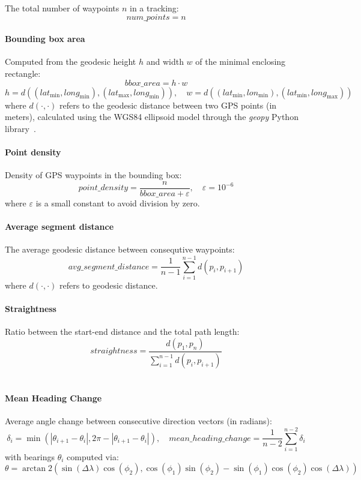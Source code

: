 \documentclass[a4paper,12pt,twoside]{scrreprt}
\begin{document}
The total number of waypoints $n$ in a tracking:
\[
  num\_points = n
\]

\paragraph{Bounding box area}

Computed from the geodesic height $h$ and width $w$ of the minimal enclosing
rectangle:
\[
  bbox\_area = h \cdot w
\]
\[
  h = d((lat_{\min}, long_{\min}), (lat_{\max}, long_{\min})), \quad w =
  d((lat_{\min}, lon_{\min}), (lat_{\min}, long_{\max}))
\]
where $d(\cdot, \cdot)$ refers to the geodesic distance between two GPS points
(in
meters), calculated using the WGS84 ellipsoid model through the \textit{geopy}
Python library~\cite{noauthor_welcome_nodate}.

\paragraph{Point density}

Density of GPS waypoints in the bounding box:
\[
  point\_density = \frac{n}{bbox\_area + \varepsilon}, \quad
  \varepsilon = 10^{-6}
\]
where $\varepsilon$ is a small constant to avoid division by zero.

\paragraph{Average segment distance}

The average geodesic distance between consequtive waypoints:
\[
  avg\_segment\_distance = \frac{1}{n-1} \sum_{i=1}^{n-1} d(p_i, p_{i+1})
\]
where $d(\cdot, \cdot)$ refers to geodesic distance.

\paragraph{Straightness}
Ratio between the start-end distance and the total path length:
\[
  straightness = \frac{d(p_1, p_n)}{\sum_{i=1}^{n-1} d(p_i, p_{i+1})}
\]
~\cite{benhamou_how_2004}

\paragraph{Mean Heading Change}
Average angle change between consecutive direction vectors (in radians):
\[
  \delta_i = \min(|\theta_{i+1} - \theta_i|, 2\pi - |\theta_{i+1} - \theta_i|),
  \quad
  mean\_heading\_change = \frac{1}{n-2} \sum_{i=1}^{n-2} \delta_i
\]
with bearings $\theta_i$ computed via:
\[
  \theta = \arctan2\left( \sin(\Delta \lambda) \cos(\phi_2),
  \cos(\phi_1)\sin(\phi_2) - \sin(\phi_1)\cos(\phi_2)\cos(\Delta \lambda)
  \right)
\]
~\cite{etemad_predicting_2018}
\end{document}
